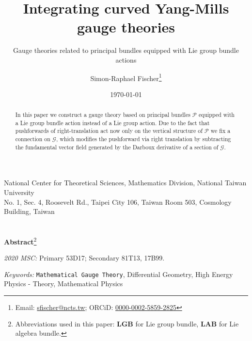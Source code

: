 \documentclass[a4paper,oneside,11pt,bibliography=totoc]{scrartcl}
\theoremstyle{plain}
\theoremstyle{remark}
\theoremstyle{definition}
\begin{document}
\renewcommand{\thefootnote}{\fnsymbol{footnote}}

\begin{titlepage}

\author{Simon-Raphael Fischer\footnote{Email: \href{mailto:sfischer@ncts.tw}{sfischer@ncts.tw}; ORCiD: \href{https://orcid.org/0000-0002-5859-2825}{0000-0002-5859-2825}} }
\title{Integrating curved Yang-Mills gauge theories} 
\subtitle{Gauge theories related to principal bundles equipped with Lie group bundle actions}
\date{\today} 
\maketitle
\thispagestyle{empty}

\begin{center}
National Center for Theoretical Sciences, Mathematics Division, National Taiwan University\\
No. 1, Sec. 4, Roosevelt Rd., Taipei City 106, Taiwan Room 503, Cosmology Building, Taiwan
\ \\
\ \\
\ \\
\textbf{Abstract}\footnote[2]{Abbreviations used in this paper: \textbf{LGB} for Lie group bundle, \textbf{LAB} for Lie algebra bundle.}
\begin{abstract}
  \small{
	In this paper we construct a gauge theory based on principal bundles $\mathcal{P}$ equipped with a Lie group bundle action instead of a Lie group action. Due to the fact that pushforwards of right-translation act now only on the vertical structure of $\mathcal{P}$ we fix a connection on $\mathcal{G}$, which modifies the pushforward via right translation by subtracting the fundamental vector field generated by the Darboux derivative of a section of $\mathcal{G}$.
}
 \end{abstract}
\end{center}

\textit{2020 MSC:} Primary 53D17; Secondary 81T13, 17B99.

\textit{Keywords:} \texttt{Mathematical Gauge Theory}, Differential Geometry, High Energy Physics - Theory, Mathematical Physics

\end{titlepage}

\end{document}
